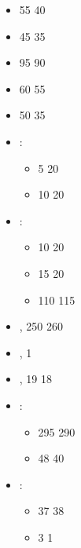 \largefontsize{}

\subtitle{beta 2.2}

\begin{itemize}
\item \spiritofthewhirlwind{} 55 \costdown{} 40
\item \glyphofamryl{} 45 \costdown{} 35
\item \wildhunter{} 95 \costdown{} 90
\item \pathfinder{} 60 \costdown{} 55
\item \forestguardian{} 50 \costdown{} 35
\item \chieftain{}\spacebeforecolon{}:
\begin{itemize}
\item \sylvanblades{} 5 \costup{} 20
\item \sylvanlance{} 10 \costup{} 20
\end{itemize}
\item \forestprince{}\spacebeforecolon{}:
\begin{itemize}
\item  \sylvanblades{} 10 \costup{} 20
\item \sylvanlance{} 15 \costup{} 20
\item \greatelk{} 110 \costup{} 115
\end{itemize}
\item \thicketshepherd{}, \basecost{} 250 \costup{} 260
\item \forestguard{}, \elvencloak{} \wordand{} \sylvanblades{} 1 \costdown{} \free{}
\item \forestrangers{}, \extramodel{} 19 \costdown{} 18
\item \wildhuntsmen{}\spacebeforecolon{}:
\begin{itemize}
\item  \basecost{} 295 \costdown{} 290
\item \extramodel{} 48 \costdown{} 40
\end{itemize}
\item \sylvansentinels{}\spacebeforecolon{}:
\begin{itemize}
\item \extramodel{} 37 \costup{} 38
\item \sylvanblades{} 3 \costdown{} 1
\end{itemize}
\end{itemize}
